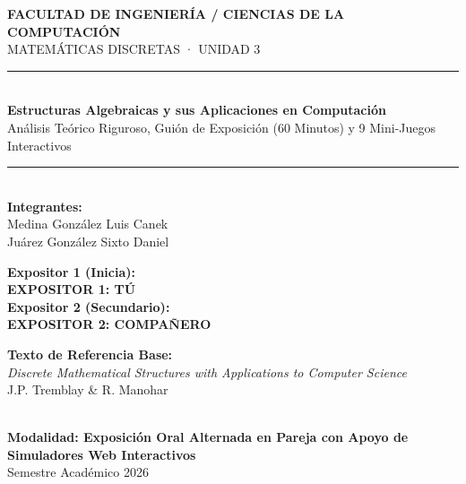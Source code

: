 \documentclass[11pt,a4paper]{article}
\newcommand{\badgeTu}{\colorbox{exp1bg}{\textcolor{exp1fg}{\bfseries\sffamily\footnotesize EXPOSITOR 1: TÚ}}}
\newcommand{\badgeComp}{\colorbox{exp2bg}{\textcolor{exp2fg}{\bfseries\sffamily\footnotesize EXPOSITOR 2: COMPAÑERO}}}
\begin{document}
\begin{titlepage}
  \centering
  \vspace*{1.5cm}
  
  {\Large\bfseries\sffamily\color{primary} FACULTAD DE INGENIERÍA / CIENCIAS DE LA COMPUTACIÓN}\\[0.3cm]
  {\large\sffamily MATEMÁTICAS DISCRETAS · UNIDAD 3}\\[1.5cm]
  
  \rule{\linewidth}{1.5pt}\\[0.5cm]
  {\huge\bfseries\sffamily Estructuras Algebraicas y sus Aplicaciones en Computación}\\[0.3cm]
  {\large\sffamily Análisis Teórico Riguroso, Guión de Exposición (60 Minutos) y 9 Mini-Juegos Interactivos}\\[0.5cm]
  \rule{\linewidth}{1.5pt}\\[0.8cm]
  {\large\sffamily\textbf{Integrantes:}}\\[0.2cm]
  {\large\sffamily Medina González Luis Canek}\\
  {\large\sffamily Juárez González Sixto Daniel}\\[1.2cm]
  
  \begin{minipage}{0.45\textwidth}
    \begin{flushleft} \large
      \textbf{Expositor 1 (Inicia):}\\
      \badgeTu\\[0.5cm]
      \textbf{Expositor 2 (Secundario):}\\
      \badgeComp
    \end{flushleft}
  \end{minipage}
  \hfill
  \begin{minipage}{0.45\textwidth}
    \begin{flushright} \large
      \textbf{Texto de Referencia Base:}\\
      \textit{Discrete Mathematical Structures with Applications to Computer Science}\\
      \small J.P. Tremblay \& R. Manohar
    \end{flushright}
  \end{minipage}\\[2.5cm]
  
  \vfill
  {\large\sffamily\bfseries Modalidad: Exposición Oral Alternada en Pareja con Apoyo de Simuladores Web Interactivos}\\[0.3cm]
  {\small Semestre Académico 2026}
\end{titlepage}
\end{document}
